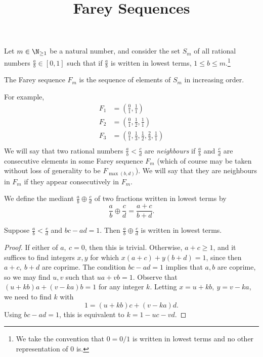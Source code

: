 \documentclass[12pt]{article}
\title{Farey Sequences}
\author{}
\date{}
\begin{document}
Let $m \in \N_{\geq 1}$ be a natural number, and consider the set $S_m$ of all rational numbers $\frac{a}{b} \in [0,1]$ such that if $\frac{a}{b}$ is written in lowest terms, $1 \leq b \leq m$.\footnote{We take the convention that $0 = 0/1$ is written in lowest terms and no other representation of $0$ is.}
\begin{defn}The Farey sequence $F_m$ is the sequence of elements of $S_m$ in increasing order.\end{defn}
For example,
\begin{align*}
F_1 &= \left(\frac{0}{1},\frac{1}{1}\right)\\
F_2 &= \left(\frac{0}{1},\frac{1}{2},\frac{1}{1}\right)\\
F_3 &= \left(\frac{0}{1},\frac{1}{3},\frac{1}{2},\frac{2}{3},\frac{1}{1}\right)\\
\end{align*}
We will say that two rational numbers $\frac a b < \frac c d$ are \emph{neighbours} if $\frac a b$ and $\frac c d$ are consecutive elements in some Farey sequence $F_m$ (which of course may be taken without loss of generality to be $F_{\max(b,d)}$). We will say that they are neighbours in $F_m$ if they appear consecutively in $F_m$.

\begin{defn}We define the mediant $\frac a b \oplus \frac c d$ of two fractions written in lowest terms by
\[\frac a b \oplus \frac c d = \frac{a+c}{b+d}.\]\end{defn}

\begin{lem} Suppose $\frac ab < \frac cd$ and $bc-ad = 1$. Then $\frac a b \oplus \frac c d$ is written in lowest terms.\end{lem}
\begin{proof}
If either of $a, \ c = 0$, then this is trivial. Otherwise, $a+c \geq 1$, and it suffices to find integers $x,y$ for which $x(a+c) + y(b+d) = 1$, since then $a+c, \ b+d$ are coprime. The condition $bc-ad = 1$ implies that $a,b$ are coprime, so we may find $u,v$ such that $ua + vb = 1$. Observe that $(u+kb)a + (v-ka)b = 1$ for any integer $k$. Letting $x = u+kb, \ y = v-ka$, we need to find $k$ with
\[1 = (u+kb)c + (v-ka)d.\] Using $bc-ad = 1$, this is equivalent to $k = 1-uc-vd$.\end{proof}
\end{document}

